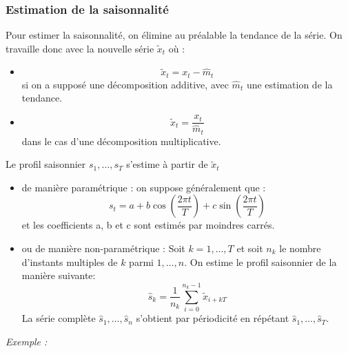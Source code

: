 \subsubsection{Estimation de la saisonnalité}
Pour estimer la saisonnalité, on élimine au préalable la tendance de la série. On travaille donc avec la nouvelle série $\tilde{x}_{t}$ où : 
\begin{itemize}
\item $$\tilde{x}_{t} = x_{t} - \hat{m}_{t}$$
si on a supposé une décomposition additive, avec $\hat{m}_{t}$ une estimation de la tendance.
\item $$\tilde{x}_{t} = \frac{x_{t}}{\hat{m}_{t}}$$
dans le cas d'une décomposition multiplicative.
\end{itemize}
Le profil saisonnier $s_{1} ,\dots, s_{T}$ s'estime à partir de $\tilde{x}_{t}$ 
\begin{itemize}
\item de manière paramétrique :\newline
on suppose généralement que :
$$s_{t} = a + b\cos\left(\frac{2\pi t}{T}\right) + c\sin\left(\frac{2\pi t}{T}\right)$$
 et les coefficients a, b et c sont estimés par moindres carrés.
\item ou de manière non-paramétrique :\newline
Soit $k = 1,\dots, T$ et soit $n_{k}$ le nombre d'instants multiples de $k$ parmi $1, \dots , n$. On estime le profil saisonnier de la manière suivante:
$$\hat{s}_{k} = \frac{1}{n_{k}} \sum_{i=0}^{n_{k}-1} \tilde{x}_{i+kT}$$
La série complète $\hat{s}_{1},\dots,\hat{s}_{n}$ s'obtient par périodicité en répétant $\hat{s}_{1},\dots,\hat{s}_{T}$.\newline
\end{itemize}
\textit{Exemple :} 
